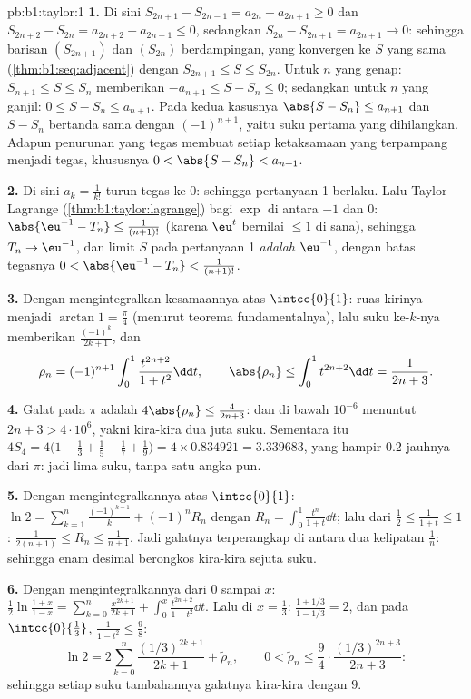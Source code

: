\begin{solution}{pb:b1:taylor:1}
\textbf{1.} Di sini $S_{2n+1} - S_{2n-1} = a_{2n} - a_{2n+1} \geq 0$ dan
$S_{2n+2} - S_{2n} = a_{2n+2} - a_{2n+1} \leq 0$, sedangkan $S_{2n}
- S_{2n+1} = a_{2n+1} \to 0$: sehingga barisan $(S_{2n+1})$ dan
$(S_{2n})$ berdampingan, yang konvergen ke $S$ yang sama
(\cref{thm:b1:seq:adjacent}) dengan $S_{2n+1} \leq S \leq S_{2n}$.
Untuk $n$ yang genap: $S_{n+1} \leq S \leq S_n$ memberikan $-a_{n+1} \leq S -
S_n \leq 0$; sedangkan untuk $n$ yang ganjil: $0 \leq S - S_n \leq a_{n+1}$. Pada kedua
kasusnya $\abs{S - S_n} \leq a_{n+1}$ dan $S - S_n$ bertanda sama dengan
$(-1)^{n+1}$, yaitu suku pertama yang dihilangkan. Adapun penurunan yang tegas membuat
setiap ketaksamaan yang terpampang menjadi tegas, khususnya $0 < \abs{S -
S_n} < a_{n+1}$.

\textbf{2.} Di sini $a_k = \frac{1}{k!}$ turun tegas ke $0$:
sehingga pertanyaan 1 berlaku. Lalu Taylor--Lagrange
(\cref{thm:b1:taylor:lagrange}) bagi $\exp$ di antara $-1$ dan $0$:
$\abs{\eu^{-1} - T_n} \leq \frac{1}{(n+1)!}$ (karena 
$\eu^t$ bernilai $\leq 1$ di sana), sehingga $T_n \to \eu^{-1}$, dan limit
$S$ pada pertanyaan 1 \emph{adalah} $\eu^{-1}$, dengan batas tegasnya
$0 < \abs{\eu^{-1} - T_n} < \frac{1}{(n+1)!}$.

\textbf{3.} Dengan mengintegralkan kesamaannya atas $\intcc{0}{1}$: ruas
kirinya menjadi $\arctan 1 = \frac\pi4$ (menurut teorema fundamentalnya), lalu
suku ke-$k$-nya memberikan $\frac{(-1)^k}{2k+1}$, dan
\[
\rho_n = (-1)^{n+1}\int_0^1 \frac{t^{2n+2}}{1+t^2}\dd t,
\qquad
\abs{\rho_n} \leq \int_0^1 t^{2n+2}\dd t = \frac{1}{2n+3} .
\]

\textbf{4.} Galat pada $\pi$ adalah $4\abs{\rho_n} \leq
\frac{4}{2n+3}$: dan di bawah $10^{-6}$ menuntut $2n + 3 > 4\cdot10^6$,
yakni kira-kira dua juta suku. Sementara itu $4S_4 = 4\bigl(1 - \frac13 +
\frac15 - \frac17 + \frac19\bigr) = 4 \times 0.834921 =
3.339683$, yang hampir $0.2$ jauhnya dari $\pi$: jadi lima suku, tanpa
satu angka pun.

\textbf{5.} Dengan mengintegralkannya atas $\intcc{0}{1}$: $\ln 2 =
\sum_{k=1}^{n} \frac{(-1)^{k-1}}{k} + (-1)^n R_n$ dengan $R_n =
\int_0^1 \frac{t^n}{1+t}\dd t$; lalu dari $\frac12 \leq \frac{1}{1+t}
\leq 1$: $\frac{1}{2(n+1)} \leq R_n \leq \frac{1}{n+1}$. Jadi
galatnya terperangkap di antara dua kelipatan $\frac1n$: sehingga enam
desimal berongkos kira-kira sejuta suku.

\textbf{6.} Dengan mengintegralkannya dari $0$ sampai $x$: $\frac12\ln\frac{1 +
x}{1 - x} = \sum_{k=0}^{n} \frac{x^{2k+1}}{2k+1} + \int_0^x
\frac{t^{2n+2}}{1-t^2}\dd t$. Lalu di $x = \frac13$: $\frac{1 +
1/3}{1 - 1/3} = 2$, dan pada $\intcc{0}{\frac13}$, $\frac{1}{1 -
t^2} \leq \frac98$:
\[
\ln 2 = 2\sum_{k=0}^{n} \frac{(1/3)^{2k+1}}{2k+1} +
\tilde\rho_n,
\qquad
0 < \tilde\rho_n \leq \frac{9}{4}\cdot
\frac{(1/3)^{2n+3}}{2n+3} :
\]
sehingga setiap suku tambahannya  galatnya kira-kira dengan $9$.


\end{solution}
